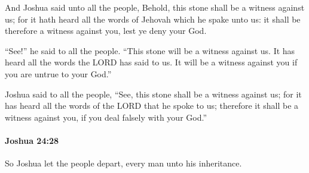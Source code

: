 			\begin{versebox}
					\item[BHS] 
					\item[ASV] And Joshua said unto all the people, Behold, this stone shall be a witness against us; for it hath heard all the words of Jehovah which he spake unto us: it shall be therefore a witness against you, lest ye deny your God.
					\item[NIV] “See!” he said to all the people. “This stone will be a witness against us. It has heard all the words the LORD has said to us. It will be a witness against you if you are untrue to your God.”
					\item[NRSV] Joshua said to all the people, “See, this stone shall be a witness against us; for it has heard all the words of the LORD that he spoke to us; therefore it shall be a witness against you, if you deal falsely with your God.”
			\end{versebox}

		\paragraph{Joshua 24:28} %
			\label{JOSHUA-24-28}

			So Joshua let the people depart, every man unto his inheritance.


